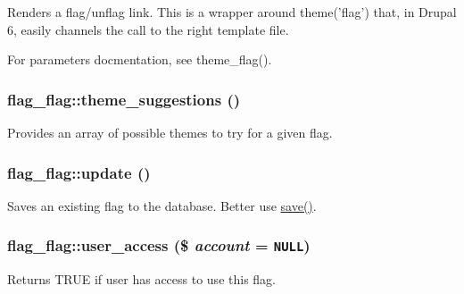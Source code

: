 Renders a flag/unflag link. This is a wrapper around theme('flag') that, in Drupal 6, easily channels the call to the right template file.

For parameters docmentation, see theme\_\-flag(). \hypertarget{classflag__flag_84ceec72735b0bbffe52eb49f560d048}{
\subsubsection[{theme\_\-suggestions}]{\setlength{\rightskip}{0pt plus 5cm}flag\_\-flag::theme\_\-suggestions ()}}
\label{classflag__flag_84ceec72735b0bbffe52eb49f560d048}


Provides an array of possible themes to try for a given flag. \hypertarget{classflag__flag_c3b0083e0f201ea33788d82dd66fdffd}{
\subsubsection[{update}]{\setlength{\rightskip}{0pt plus 5cm}flag\_\-flag::update ()}}
\label{classflag__flag_c3b0083e0f201ea33788d82dd66fdffd}


Saves an existing flag to the database. Better use \hyperlink{classflag__flag_675d03274caed0ba6b3ecbb87f23f96b}{save()}. \hypertarget{classflag__flag_4ea0b1daeca6c2ef4a900a8a13785b6c}{
\subsubsection[{user\_\-access}]{\setlength{\rightskip}{0pt plus 5cm}flag\_\-flag::user\_\-access (\$ {\em account} = {\tt NULL})}}
\label{classflag__flag_4ea0b1daeca6c2ef4a900a8a13785b6c}


Returns TRUE if user has access to use this flag.

